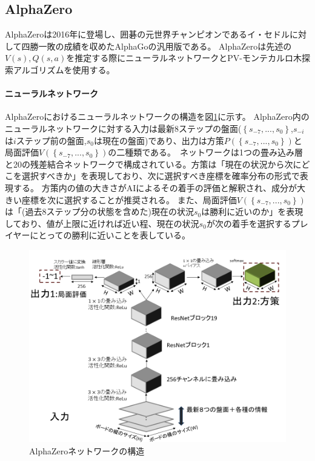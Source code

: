\subsection{AlphaZero}
AlphaZeroは2016年に登場し、囲碁の元世界チャンピオンであるイ・セドルに対して四勝一敗の成績を収めたAlphaGoの汎用版である。
AlphaZeroは先述の$V(s),Q(s, a)$を推定する際にニューラルネットワークとPV-モンテカルロ木探索アルゴリズムを使用する。
\paragraph{ニューラルネットワーク}
AlphaZeroにおけるニューラルネットワークの構造を図\ref{fig:network}に示す。
AlphaZero内のニューラルネットワークに対する入力は最新$8$ステップの盤面($\left\{ s_{-7}, ..., s_0 \right\}$,$s_{-i}$は$i$ステップ前の盤面,$s_{0}$は現在の盤面)であり、出力は方策$P(\left\{ s_{-7}, ..., s_0 \right\})$と
局面評価$V(\left\{ s_{-7}, ..., s_0 \right\})$の二種類である。\
ネットワークは1つの畳み込み層と20の残差結合ネットワークで構成されている。方策は「現在の状況から次にどこを選択すべきか」を表現しており、次に選択すべき座標を確率分布の形式で表現する。
方策内の値の大きさがAIによるその着手の評価と解釈され、成分が大きい座標を次に選択することが推奨される。
また、局面評価$V(\left\{ s_{-7}, ..., s_0 \right\})$は「(過去8ステップ分の状態を含めた)現在の状況$s_0$は勝利に近いのか」を表現しており、値が上限に近ければ近い程、現在の状況$s_0$が次の着手を選択するプレイヤーにとっての勝利に近いことを表している。
\begin{figure}[t]
	\centering
	\includegraphics[width=\linewidth]{./figure/network.png}
	\caption{AlphaZeroネットワークの構造}
	\label{fig:network}
\end{figure}
